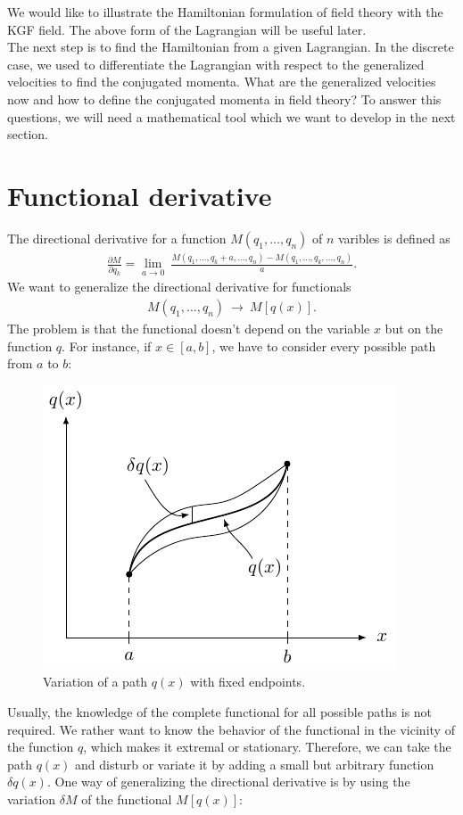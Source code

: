 We would like to illustrate the Hamiltonian formulation of field theory with the KGF field. The above form of the Lagrangian will be useful later. \\
The next step is to find the Hamiltonian from a given Lagrangian. In the discrete case, we used to differentiate the Lagrangian with respect to the generalized velocities to find the conjugated momenta. What are the generalized velocities now and how to define the conjugated momenta in field theory? To answer this questions, we will need a mathematical tool which we want to develop in the next section. 

\pagebreak

\section{Functional derivative}

The directional derivative for a function $M(q_1, \dots, q_n)$ of $n$ varibles is defined as
\begin{align}
\frac{\partial M}{\partial q_k} = \lim_{a \rightarrow 0} \ \frac{M(q_1, \dots, q_k + a, \dots, q_n) - M(q_1, \dots, q_k, \dots, q_n)}{a}.
\end{align}
We want to generalize the directional derivative for functionals
\begin{align}
M(q_1, \dots, q_n) \ \longrightarrow \ M[q(x)].
\end{align}
The problem is that the functional doesn't depend on the variable $x$ but on the function $q$. For instance, if $x \in [a,b]$, we have to consider every possible path from $a$ to $b$:
\begin{figure}[H]
\begin{center}
\includegraphics[scale=1.8]{img/variation.pdf}
\end{center}
\caption{Variation of a path $q(x)$ with fixed endpoints.}
\label{fig:7}
\end{figure}
Usually, the knowledge of the complete functional for all possible paths is not required. We rather want to know the behavior of the functional in the vicinity of the function $q$, which makes it extremal or stationary. Therefore, we can take the path $q(x)$ and disturb or variate it by adding a small but arbitrary function $\delta q(x)$. One way of generalizing the directional derivative is by using the variation $\delta M$ of the functional $M[q(x)]$:

